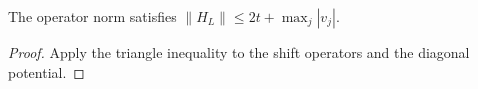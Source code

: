 \begin{lem}\label{lem:norm}
The operator norm satisfies $\|H_L\| \le 2t + \max_j |v_j|$.
\end{lem}
\begin{proof}
Apply the triangle inequality to the shift operators and the diagonal potential.
\end{proof}
